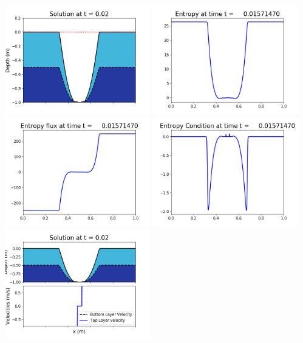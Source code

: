 \documentclass[11pt]{article}
\begin{document}
\includegraphics[width=0.475\textwidth]{frame0098fig1006.png}
\vskip 10pt 
\includegraphics[width=0.475\textwidth]{frame0098fig1007.png}
\includegraphics[width=0.475\textwidth]{frame0098fig1008.png}
\vskip 10pt 
\includegraphics[width=0.475\textwidth]{frame0098fig1009.png}
\vskip 10pt 
\includegraphics[width=0.475\textwidth]{frame0099fig1001.png}
\end{document}
